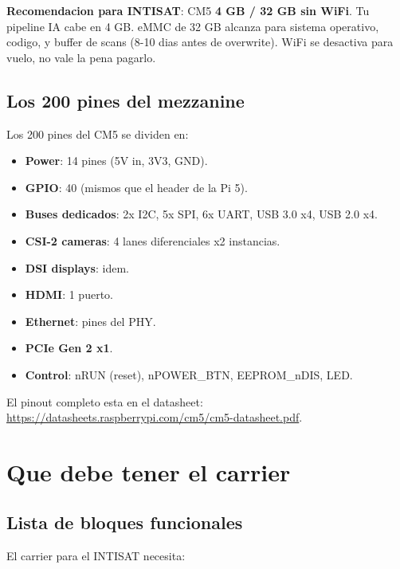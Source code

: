 \documentclass[11pt,a4paper,oneside,openright]{book}
\begin{document}
\begin{payload}
\textbf{Recomendacion para INTISAT}: CM5 \textbf{4 GB / 32 GB sin WiFi}.
Tu pipeline IA cabe en 4 GB. eMMC de 32 GB alcanza para sistema operativo,
codigo, y buffer de scans (8-10 dias antes de overwrite). WiFi se desactiva
para vuelo, no vale la pena pagarlo.
\end{payload}

\section{Los 200 pines del mezzanine}

Los 200 pines del CM5 se dividen en:

\begin{itemize}[leftmargin=2em]
  \item \textbf{Power}: 14 pines (5V in, 3V3, GND).
  \item \textbf{GPIO}: 40 (mismos que el header de la Pi 5).
  \item \textbf{Buses dedicados}: 2x I2C, 5x SPI, 6x UART, USB 3.0 x4, USB 2.0 x4.
  \item \textbf{CSI-2 cameras}: 4 lanes diferenciales x2 instancias.
  \item \textbf{DSI displays}: idem.
  \item \textbf{HDMI}: 1 puerto.
  \item \textbf{Ethernet}: pines del PHY.
  \item \textbf{PCIe Gen 2 x1}.
  \item \textbf{Control}: nRUN (reset), nPOWER\_BTN, EEPROM\_nDIS, LED.
\end{itemize}

El pinout completo esta en el datasheet:
\url{https://datasheets.raspberrypi.com/cm5/cm5-datasheet.pdf}.

\chapter{Que debe tener el carrier}

\section{Lista de bloques funcionales}

El carrier para el INTISAT necesita:
\end{document}
